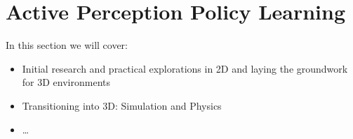 \chapter{Active Perception Policy Learning}
In this section we will cover:
  \begin{itemize}
    \item Initial research and practical explorations in 2D and laying the groundwork for 3D environments
    \item Transitioning into 3D: Simulation and Physics
    \item \ldots
  \end{itemize}


